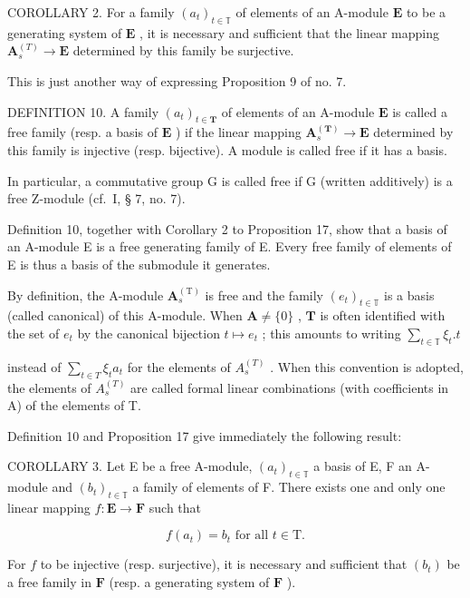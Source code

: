 COROLLARY 2. For a family \((a_{t})_{t\in \mathbb{T}}\) of elements of an A-module \(\mathbf{E}\) to be a generating system of \(\mathbf{E}\) , it is necessary and sufficient that the linear mapping \(\mathbf{A}_{s}^{(T)}\to \mathbf{E}\) determined by this family be surjective.

This is just another way of expressing Proposition 9 of no. 7.

DEFINITION 10. A family \((a_{t})_{t\in \mathbf{T}}\) of elements of an A-module \(\mathbf{E}\) is called a free family (resp. a basis of \(\mathbf{E}\) ) if the linear mapping \(\mathbf{A}_{s}^{(\mathbf{T})}\to \mathbf{E}\) determined by this family is injective (resp. bijective). A module is called free if it has a basis.

In particular, a commutative group G is called free if G (written additively) is a free Z-module (cf.~I, § 7, no. 7).

Definition 10, together with Corollary 2 to Proposition 17, show that a basis of an A-module E is a free generating family of E. Every free family of elements of E is thus a basis of the submodule it generates.

By definition, the A-module \(\mathbf{A}_s^{(\mathrm{T})}\) is free and the family \((e_t)_{t\in \mathbb{T}}\) is a basis (called canonical) of this A-module. When \(\mathbf{A}\neq \{0\}\) , \(\mathbf{T}\) is often identified with the set of \(e_t\) by the canonical bijection \(t\mapsto e_t\) ; this amounts to writing \(\sum_{t\in \mathbb{T}}\xi_t.t\)

instead of \(\sum_{t\in T}\xi_{t}a_{t}\) for the elements of \(A_{s}^{(T)}\) . When this convention is adopted, the elements of \(A_{s}^{(T)}\) are called formal linear combinations (with coefficients in A) of the elements of T.

Definition 10 and Proposition 17 give immediately the following result:

COROLLARY 3. Let E be a free A-module, \((a_{t})_{t\in \mathbb{T}}\) a basis of E, F an A-module and \((b_{t})_{t\in \mathbb{T}}\) a family of elements of F. There exists one and only one linear mapping \(f:\mathbf{E}\to \mathbf{F}\) such that

\[
f (a _ {t}) = b _ {t} \text {   for   all   } t \in \mathrm{T}.\tag{45}
\]

For \(f\) to be injective (resp. surjective), it is necessary and sufficient that \((b_t)\) be a free family in \(\mathbf{F}\) (resp. a generating system of \(\mathbf{F}\) ).

